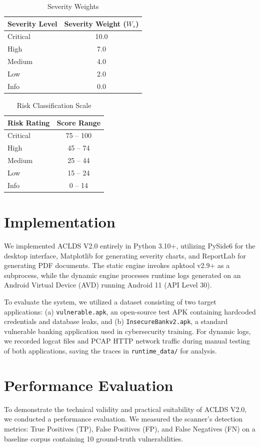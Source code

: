 \documentclass[conference]{
IEEEtran}
\begin{document}
\begin{table}[h]
\caption{Severity Weights}
\centering
\begin{tabular}{lc}
\toprule
\textbf{Severity Level} & \textbf{Severity Weight ($W_s$)} \\
\midrule
Critical & 10.0 \\
High & 7.0 \\
Medium & 4.0 \\
Low & 2.0 \\
Info & 0.0 \\
\bottomrule
\end{tabular}
\end{table}

\begin{table}[h]
\caption{Risk Classification Scale}
\centering
\begin{tabular}{lc}
\toprule
\textbf{Risk Rating} & \textbf{Score Range} \\
\midrule
Critical & 75 -- 100 \\
High & 45 -- 74 \\
Medium & 25 -- 44 \\
Low & 15 -- 24 \\
Info & 0 -- 14 \\
\bottomrule
\end{tabular}
\end{table}

\section{Implementation}
We implemented ACLDS V2.0 entirely in Python 3.10+, utilizing PySide6 for the desktop interface, Matplotlib for generating severity charts, and ReportLab for generating PDF documents. The static engine invokes apktool v2.9+ as a subprocess, while the dynamic engine processes runtime logs generated on an Android Virtual Device (AVD) running Android 11 (API Level 30).

To evaluate the system, we utilized a dataset consisting of two target applications: (a) \texttt{vulnerable.apk}, an open-source test APK containing hardcoded credentials and database leaks, and (b) \texttt{InsecureBankv2.apk}, a standard vulnerable banking application used in cybersecurity training. For dynamic logs, we recorded logcat files and PCAP HTTP network traffic during manual testing of both applications, saving the traces in \texttt{runtime\_data/} for analysis.

\section{Performance Evaluation}
To demonstrate the technical validity and practical suitability of ACLDS V2.0, we conducted a performance evaluation. We measured the scanner's detection metrics: True Positives (TP), False Positives (FP), and False Negatives (FN) on a baseline corpus containing 10 ground-truth vulnerabilities.
\end{document}
